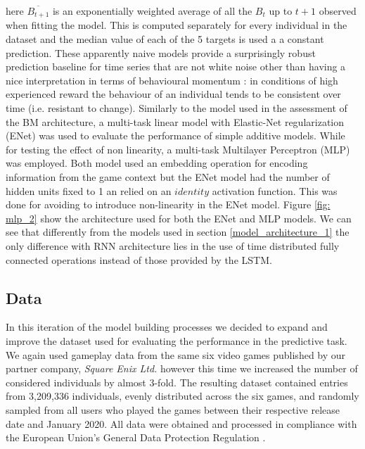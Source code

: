 here $\overline{B_{t+1}}$ is an exponentially weighted average of all the $B_t$ up to $t+1$ observed when fitting the model. This is computed separately for every individual in the dataset and the median value of each of the 5 targets is used a a constant prediction. These apparently naive models provide a surprisingly robust prediction baseline for time series that are not white noise \cite{hyndman2018forecasting} other than having a nice interpretation in terms of behavioural momentum \cite{nevin2000behavioral}: in conditions of high experienced reward the behaviour of an individual tends to be consistent over time (i.e. resistant to change). Similarly to the model used in the assessment of the BM architecture, a multi-task linear model with Elastic-Net regularization (ENet) \cite{zou2005regularization} was used to evaluate the performance of simple additive models. While for testing the effect of non linearity, a multi-task Multilayer Perceptron (MLP) was employed. Both model used an embedding operation for encoding information from the game context but the ENet model had the number of hidden units fixed to 1 an relied on an $identity$ activation function. This was done for avoiding to introduce non-linearity in the ENet model. Figure \ref{fig: mlp_2} show the architecture used for both the ENet and MLP models. We can see that differently from the models used in section \ref{model_architecture_1} the only difference with RNN architecture lies in the use of time distributed fully connected operations instead of those provided by the LSTM. 


\subsection{Data}
\label{data_2}
In this iteration of the model building processes we decided to expand and improve the dataset used for evaluating the performance in the predictive task. We again used gameplay data from the same six video games published by our partner company, \textit{Square Enix Ltd.} however this time we increased the number of considered individuals by almost 3-fold. The resulting dataset contained entries from 3,209,336 individuals, evenly distributed across the six games, and randomly sampled from all users who played the games between their respective release date and January 2020. All data were obtained and processed in compliance with the European Union's General Data Protection Regulation \cite{EUdataregulations2018}. 
